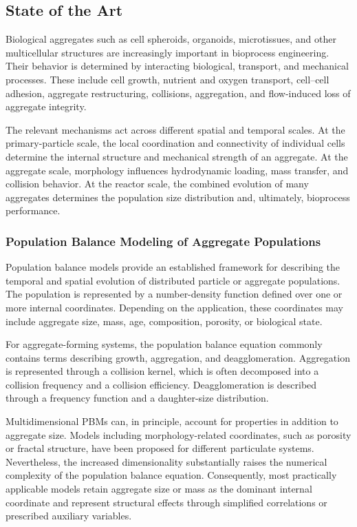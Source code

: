 \documentclass[11pt,a4paper,twoside]{scrartcl}
\begin{document}
\subsection{State of the Art
	\label{state-of-the-art}
	\label{sec:stateofart}}

Biological aggregates such as cell spheroids, organoids, microtissues, and other multicellular structures are increasingly important in bioprocess engineering. Their behavior is determined by interacting biological, transport, and mechanical processes. These include cell growth, nutrient and oxygen transport, cell--cell adhesion, aggregate restructuring, collisions, aggregation, and flow-induced loss of aggregate integrity.

The relevant mechanisms act across different spatial and temporal scales. At the primary-particle scale, the local coordination and connectivity of individual cells determine the internal structure and mechanical strength of an aggregate. At the aggregate scale, morphology influences hydrodynamic loading, mass transfer, and collision behavior. At the reactor scale, the combined evolution of many aggregates determines the population size distribution and, ultimately, bioprocess performance.

\subsubsection{Population Balance Modeling of Aggregate Populations}

Population balance models provide an established framework for describing the temporal and spatial evolution of distributed particle or aggregate populations. The population is represented by a number-density function defined over one or more internal coordinates. Depending on the application, these coordinates may include aggregate size, mass, age, composition, porosity, or biological state.

For aggregate-forming systems, the population balance equation commonly contains terms describing growth, aggregation, and deagglomeration. Aggregation is represented through a collision kernel, which is often decomposed into a collision frequency and a collision efficiency. Deagglomeration is described through a frequency function and a daughter-size distribution.

Multidimensional PBMs can, in principle, account for properties in addition to aggregate size. Models including morphology-related coordinates, such as porosity or fractal structure, have been proposed for different particulate systems. Nevertheless, the increased dimensionality substantially raises the numerical complexity of the population balance equation. Consequently, most practically applicable models retain aggregate size or mass as the dominant internal coordinate and represent structural effects through simplified correlations or prescribed auxiliary variables.
\end{document}
